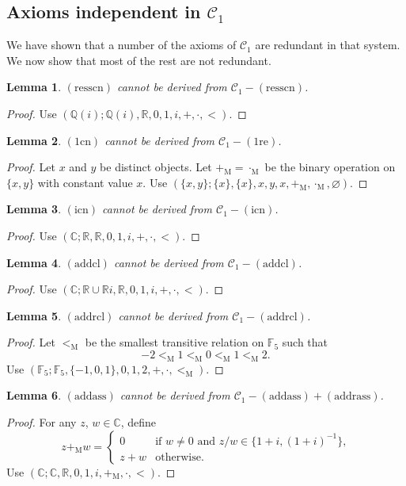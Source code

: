 \documentclass{article}
\newcommand\bC{\mathbb{C}}
\newcommand\bF{\mathbb{F}}
\newcommand\bR{\mathbb{R}}
\newcommand\bQ{\mathbb{Q}}
\newcommand\cC{\mathcal{C}}
\newcommand\rM{\mathrm{M}}
\newtheorem{lemma}{Lemma}[section]
\begin{document}
\subsection{Axioms independent in $\cC_1$}

We have shown that a number of the axioms of $\cC_1$ are redundant in that system. We now show that most of the rest are not redundant.

\begin{lemma}
$\mathrm{(resscn)}$ cannot be derived from $\cC_1 - \mathrm{(resscn)}$.
\end{lemma}
\begin{proof}
Use $(\bQ(i); \bQ(i), \bR, 0, 1, i, +, \cdot, <)$.
\end{proof}

\begin{lemma}
$\mathrm{(1cn)}$ cannot be derived from $\cC_1 - \mathrm{(1re)}$.
\end{lemma}
\begin{proof}
Let $x$ and $y$ be distinct objects. Let $+_\rM = \cdot_\rM$ be the binary operation on $\{x, y\}$ with constant value $x$.
Use $(\{x,y\}; \{x\}, \{x\}, x, y, x, +_\rM, \cdot_\rM, \varnothing)$.
\end{proof}

\begin{lemma}
$\mathrm{(icn)}$ cannot be derived from $\cC_1 - \mathrm{(icn)}$.
\end{lemma}
\begin{proof}
Use $(\bC; \bR, \bR, 0, 1, i, +, \cdot, <)$.
\end{proof}

\begin{lemma}
$\mathrm{(addcl)}$ cannot be derived from $\cC_1 - \mathrm{(addcl)}$.
\end{lemma}
\begin{proof}
Use $(\bC; \bR \cup \bR i, \bR, 0, 1, i, +, \cdot, <)$.
\end{proof}

\begin{lemma}
$\mathrm{(addrcl)}$ cannot be derived from $\cC_1 - \mathrm{(addrcl)}$.
\end{lemma}
\begin{proof}
Let $<_\rM$ be the smallest transitive relation on $\bF_5$ such that
\[ -2 <_\rM 1 <_\rM 0 <_\rM 1 <_\rM 2. \]
Use $(\bF_5; \bF_5, \{-1, 0, 1\}, 0, 1, 2, +, \cdot, <_\rM)$. 
\end{proof}

\begin{lemma}
$\mathrm{(addass)}$ cannot be derived from $\cC_1 - \mathrm{(addass)} + \mathrm{(addrass)}$.
\end{lemma}
\begin{proof}
For any $z$, $w \in \bC$, define
\[ z +_\rM w = \begin{cases} 0 & \text{if $w \ne 0$ and $z/w \in \{1+i, (1+i)^{-1}\}$,} \\ z+w & \text{otherwise.}\end{cases} \]
Use $(\bC; \bC, \bR, 0, 1, i, +_\rM, \cdot, <)$.
\end{proof}
\end{document}
